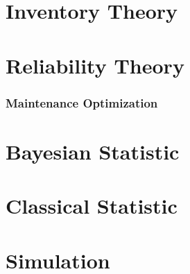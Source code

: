 \documentclass[10pt]{book}
\begin{document}
	\part{Inventory Theory}

	\part{Reliability Theory}

		\section{Maintenance Optimization}

	\part{Bayesian Statistic}

	\part{Classical Statistic}

	\part{Simulation}
\end{document}

